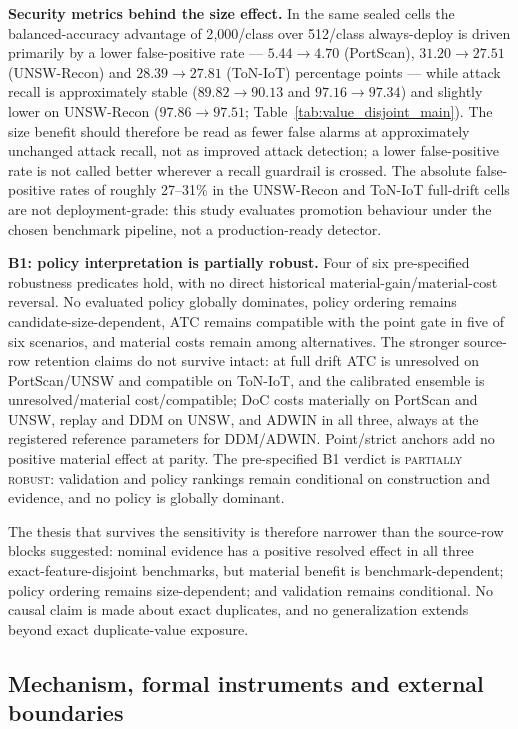 \documentclass[journal]{IEEEtran}
\begin{document}
\textbf{Security metrics behind the size effect.} In the same sealed cells the balanced-accuracy advantage of 2{,}000/class over 512/class always-deploy is driven primarily by a lower false-positive rate --- $5.44\to4.70$ (PortScan), $31.20\to27.51$ (UNSW-Recon) and $28.39\to27.81$ (ToN-IoT) percentage points --- while attack recall is approximately stable ($89.82\to90.13$ and $97.16\to97.34$) and slightly lower on UNSW-Recon ($97.86\to97.51$; Table~\ref{tab:value_disjoint_main}). The size benefit should therefore be read as fewer false alarms at approximately unchanged attack recall, not as improved attack detection; a lower false-positive rate is not called better wherever a recall guardrail is crossed. The absolute false-positive rates of roughly 27--31\% in the UNSW-Recon and ToN-IoT full-drift cells are not deployment-grade: this study evaluates promotion behaviour under the chosen benchmark pipeline, not a production-ready detector.

\textbf{B1: policy interpretation is partially robust.} Four of six pre-specified robustness predicates hold, with no direct historical material-gain/material-cost reversal. No evaluated policy globally dominates, policy ordering remains candidate-size-dependent, ATC remains compatible with the point gate in five of six scenarios, and material costs remain among alternatives. The stronger source-row retention claims do not survive intact: at full drift ATC is unresolved on PortScan/UNSW and compatible on ToN-IoT, and the calibrated ensemble is unresolved/material cost/compatible; DoC costs materially on PortScan and UNSW, replay and DDM on UNSW, and ADWIN in all three, always at the registered reference parameters for DDM/ADWIN. Point/strict anchors add no positive material effect at parity. The pre-specified B1 verdict is \textsc{partially robust}: validation and policy rankings remain conditional on construction and evidence, and no policy is globally dominant.

The thesis that survives the sensitivity is therefore narrower than the source-row blocks suggested: nominal evidence has a positive resolved effect in all three exact-feature-disjoint benchmarks, but material benefit is benchmark-dependent; policy ordering remains size-dependent; and validation remains conditional. No causal claim is made about exact duplicates, and no generalization extends beyond exact duplicate-value exposure.

\subsection{Mechanism, formal instruments and external boundaries}
\label{sec:v2}
\label{sec:risk}
\label{sec:boundaries}
\end{document}
